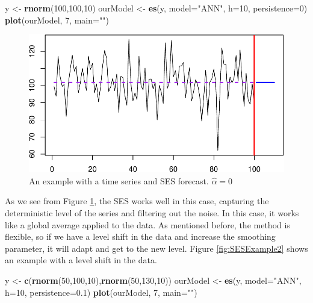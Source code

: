 \documentclass[]{book}
\newenvironment{Shaded}{\begin{snugshade}}{\end{snugshade}}
\newcommand{\DataTypeTok}[1]{\textcolor[rgb]{0.13,0.29,0.53}{#1}}
\newcommand{\DecValTok}[1]{\textcolor[rgb]{0.00,0.00,0.81}{#1}}
\newcommand{\FloatTok}[1]{\textcolor[rgb]{0.00,0.00,0.81}{#1}}
\newcommand{\KeywordTok}[1]{\textcolor[rgb]{0.13,0.29,0.53}{\textbf{#1}}}
\newcommand{\NormalTok}[1]{#1}
\newcommand{\StringTok}[1]{\textcolor[rgb]{0.31,0.60,0.02}{#1}}
\theoremstyle{definition}
\theoremstyle{definition}
\theoremstyle{definition}
\theoremstyle{definition}
\theoremstyle{remark}
\begin{document}
\begin{Shaded}
\begin{Highlighting}[]
\NormalTok{y <-}\StringTok{ }\KeywordTok{rnorm}\NormalTok{(}\DecValTok{100}\NormalTok{,}\DecValTok{100}\NormalTok{,}\DecValTok{10}\NormalTok{)}
\NormalTok{ourModel <-}\StringTok{ }\KeywordTok{es}\NormalTok{(y, }\DataTypeTok{model=}\StringTok{"ANN"}\NormalTok{, }\DataTypeTok{h=}\DecValTok{10}\NormalTok{, }\DataTypeTok{persistence=}\DecValTok{0}\NormalTok{)}
\KeywordTok{plot}\NormalTok{(ourModel, }\DecValTok{7}\NormalTok{, }\DataTypeTok{main=}\StringTok{""}\NormalTok{)}
\end{Highlighting}
\end{Shaded}

\begin{figure}
\centering
\includegraphics{Svetunkov--2022----ADAM_files/figure-latex/SESExample1-1.pdf}
\caption{\label{fig:SESExample1}An example with a time series and SES forecast. \(\hat{\alpha}=0\)}
\end{figure}

As we see from Figure \ref{fig:SESExample1}, the SES works well in this case, capturing the deterministic level of the series and filtering out the noise. In this case, it works like a global average applied to the data. As mentioned before, the method is flexible, so if we have a level shift in the data and increase the smoothing parameter, it will adapt and get to the new level. Figure \ref{fig:SESExample2} shows an example with a level shift in the data.

\begin{Shaded}
\begin{Highlighting}[]
\NormalTok{y <-}\StringTok{ }\KeywordTok{c}\NormalTok{(}\KeywordTok{rnorm}\NormalTok{(}\DecValTok{50}\NormalTok{,}\DecValTok{100}\NormalTok{,}\DecValTok{10}\NormalTok{),}\KeywordTok{rnorm}\NormalTok{(}\DecValTok{50}\NormalTok{,}\DecValTok{130}\NormalTok{,}\DecValTok{10}\NormalTok{))}
\NormalTok{ourModel <-}\StringTok{ }\KeywordTok{es}\NormalTok{(y, }\DataTypeTok{model=}\StringTok{"ANN"}\NormalTok{, }\DataTypeTok{h=}\DecValTok{10}\NormalTok{, }\DataTypeTok{persistence=}\FloatTok{0.1}\NormalTok{)}
\KeywordTok{plot}\NormalTok{(ourModel, }\DecValTok{7}\NormalTok{, }\DataTypeTok{main=}\StringTok{""}\NormalTok{)}
\end{Highlighting}
\end{Shaded}
\end{document}

